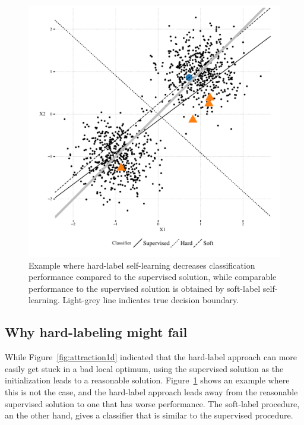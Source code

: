 \documentclass[conference,a4paper,10pt]{IEEEtran}\usepackage[]{graphicx}\usepackage[]{color}
\makeatletter
\def\maxwidth{ %
  \ifdim\Gin@nat@width>\linewidth
    \linewidth
  \else
    \Gin@nat@width
  \fi
}
\newenvironment{knitrout}{}{} %
\makeatother
\begin{document}
\begin{knitrout}
\color{fgcolor}\begin{figure}
\includegraphics[width=\maxwidth]{figure/example-1} \caption[Example where hard-label self-learning decreases classification performance compared to the supervised solution, while comparable performance to the supervised solution is obtained by soft-label self-learning]{Example where hard-label self-learning decreases classification performance compared to the supervised solution, while comparable performance to the supervised solution is obtained by soft-label self-learning. Light-grey line indicates true decision boundary.}\label{fig:example}
\end{figure}


\end{knitrout}


\subsection{Why hard-labeling might fail}
While Figure~\ref{fig:attraction1d} indicated that the hard-label approach can more easily get stuck in a bad local optimum, using the supervised solution as the initialization leads to a reasonable solution. Figure~\ref{fig:example} shows an example where this is not the case, and the hard-label approach leads away from the reasonable supervised solution to one that has worse performance. The soft-label procedure, an the other hand, gives a classifier that is similar to the supervised procedure.
\end{document}
